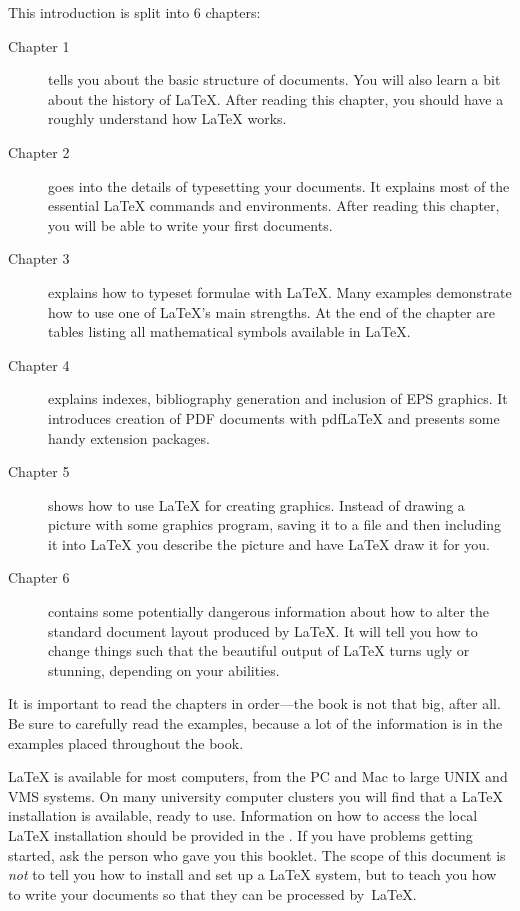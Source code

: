 \bigskip
\noindent This introduction is split into 6 chapters:
\begin{description}
\item[Chapter 1] tells you about the basic structure of \LaTeXe{}
  documents. You will also learn a bit about the history of \LaTeX{}.
  After reading this chapter, you should have a roughly understand how
  \LaTeX{} works.
\item[Chapter 2] goes into the details of typesetting your
  documents. It explains most of the essential \LaTeX{} commands and
  environments. After reading this chapter, you will be able to write
  your first documents. 
\item[Chapter 3] explains how to typeset formulae with \LaTeX. Many
  examples demonstrate how to use one of \LaTeX{}'s
  main strengths. At the end of the chapter are tables listing
  all mathematical symbols available in \LaTeX{}.
\item[Chapter 4] explains indexes,  bibliography generation and
  inclusion of EPS graphics. It introduces creation of PDF documents with pdf\LaTeX{}
  and presents some handy extension packages.
\item[Chapter 5] shows how to use \LaTeX{} for creating graphics. Instead
  of drawing a picture with some graphics program, saving it to a file and
  then including it into \LaTeX{} you describe the picture and have \LaTeX{}
  draw it for you.
\item[Chapter 6] contains some potentially dangerous information about
  how to alter the
  standard document layout produced by \LaTeX{}. It will tell you how  to
  change things such that the beautiful output of \LaTeX{}
  turns ugly or stunning, depending on your abilities.
\end{description}
\bigskip
\noindent It is important to read the chapters in order---the book is
not that big, after all. Be sure to carefully read the examples,
because a lot of the information is in the
examples placed throughout the book.

\bigskip
\noindent \LaTeX{} is available for most computers, from the PC and Mac to large
UNIX and VMS systems. On many university computer clusters you will
find that a \LaTeX{} installation is available, ready to use.
Information on how to access
the local \LaTeX{} installation should be provided in the \guide. If
you have problems getting started, ask the person who gave you this
booklet. The scope of this document is \emph{not} to tell you how to
install and set up a \LaTeX{} system, but to teach you how to write
your documents so that they can be processed by~\LaTeX{}.


